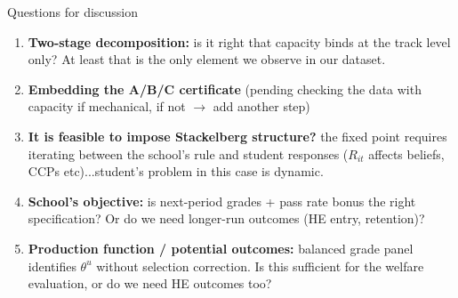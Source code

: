 \documentclass[10pt,aspectratio=169]{beamer}
\begin{document}
\begin{frame}{Questions for discussion}
\small

\begin{enumerate}\setlength\itemsep{6pt}
  \item \textbf{Two-stage decomposition:} is it right that capacity binds at the track level only? At least that is the only element we observe in our dataset.
  \item \textbf{Embedding the A/B/C certificate} (pending checking the data with capacity if mechanical, if not $\rightarrow$ add another step)
  \item \textbf{It is feasible to impose Stackelberg structure?} the fixed point requires iterating between the school's rule and student responses ($R_{it}$ affects beliefs, CCPs etc)...student's problem in this case is dynamic.
  \item \textbf{School's objective:} is next-period grades + pass rate bonus the right specification? Or do we need longer-run outcomes (HE entry, retention)?
  \item \textbf{Production function / potential outcomes:} balanced grade panel identifies $\theta^u$ without selection correction. Is this sufficient for the welfare evaluation, or do we need HE outcomes too?
\end{enumerate}
\end{frame}
\end{document}

